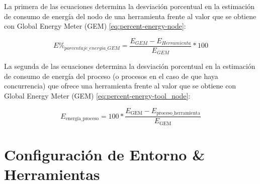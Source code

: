 La primera de las ecuaciones determina la desviación porcentual en la estimación de consumo de energía del nodo de una herramienta frente al valor que se obtiene con Global Energy Meter (GEM) \ref{eq:percent-energy-node}:

\[E\%_{porcentaje\_energia\_GEM} = \frac{E_{GEM}-E_{Herramienta}}{E_{GEM}}*100 \label{eq:percent-energy-node}\]

La segunda de las ecuaciones determina la desviación porcentual en la estimación de consumo de energía del proceso (o procesos en el caso de que haya concurrencia) que ofrece una herramienta frente al valor que se obtiene con Global Energy Meter (GEM) \ref{eq:percent-energy-tool_node}:

\[E_{\textrm{energía\_proceso}} = 100 * \frac{E_{\textrm{GEM}} - E_{\textrm{proceso\_herramienta}}}{E_{\textrm{GEM}}} \label{eq:percent-energy-tool_node}\]

\section{Configuración de Entorno \& Herramientas}\label{exp0-environment}
 



